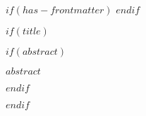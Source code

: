 \baselineskip24pt

$if(has-frontmatter)$
\frontmatter
$endif$

$if(title)$
\maketitle

$if(abstract)$
\begin{sciabstract}
$abstract$
\end{sciabstract}
$endif$

$endif$